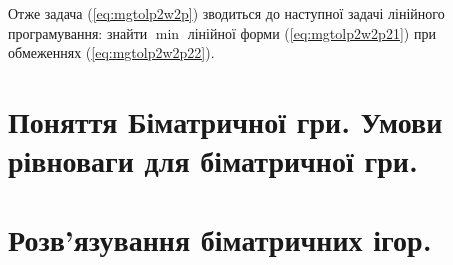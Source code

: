 \documentclass[12pt,a4paper]{report}
\begin{document}
Отже задача (\ref{eq:mgtolp2w2p}) зводиться до наступної задачі лінійного програмування: знайти $\min$ лінійної форми (\ref{eq:mgtolp2w2p21}) при обмеженнях (\ref{eq:mgtolp2w2p22}).

\clearpage

\chapter{Поняття Біматричної гри. Умови рівноваги для біматричної гри.}

\clearpage

\chapter{Розв'язування біматричних ігор.}
\end{document}
